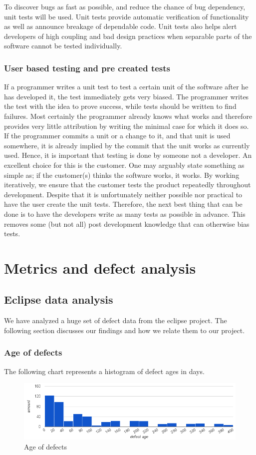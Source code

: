 \documentclass{article}
\begin{document}
To discover bugs as fast as possible, and reduce the chance of bug dependency, unit tests will be used.
Unit tests provide automatic verification of functionality as well as announce breakage of dependable code.
Unit tests also helps alert developers of high coupling and bad design practices when separable parts of the software cannot be tested individually.

\subsubsection{User based testing and pre created tests}\label{user based testing}
If a programmer writes a unit test to test a certain unit of the software after he has developed it, the test immediately gets very biased.
The programmer writes the test with the idea to prove success, while tests should be written to find failures.
Most certainly the programmer already knows what works and therefore provides very little attribution by writing the minimal case for which it does so. 
If the programmer commits a unit or a change to it, and that unit is used somewhere, it is already implied by the commit that the unit works as currently used.
Hence, it is important that testing is done by someone not a developer.
An excellent choice for this is the customer.
One may arguably state something as simple as; if the customer(s) thinks the software works, it works.
By working iteratively, we ensure that the customer tests the product repeatedly throughout development.
Despite that it is unfortunately neither possible nor practical to have the user create the unit tests.
Therefore, the next best thing that can be done is to have the developers write as many tests as possible in advance.
This removes some (but not all) post development knowledge that can otherwise bias tests.

\section{Metrics and defect analysis}

\subsection{Eclipse data analysis}
We have analyzed a huge set of defect data from the eclipse project.
The following section discusses our findings and how we relate them to our project.

\subsubsection{Age of defects}
The following chart represents a histogram of defect ages in days.
\begin{figure}[h]
\center
\includegraphics[width=160mm]{defect_ages.png}
\caption{Age of defects}
\end{figure}
\end{document}
